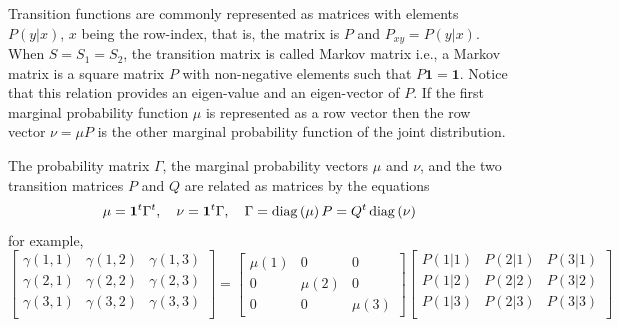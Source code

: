 \documentclass[12pt,a4paper]{amsart}
\newcommand{\one}{\bm 1}
\theoremstyle{plain}%
\theoremstyle{definition}
\theoremstyle{remark}
\begin{document}
Transition functions are commonly represented as matrices with
elements $P(y|x)$, $x$ being the row-index, that is, the matrix is $P$
and $P_{xy} = P(y|x)$. When $S=S_1=S_2$, the transition matrix is
called Markov matrix i.e., a Markov matrix is a square matrix $P$ with
non-negative elements such that $P \one = \one$. Notice that this
relation provides an eigen-value and an eigen-vector of $P$. If the
first marginal probability function $\mu$ is represented as a row
vector then the row vector $\nu = \mu P$ is the other marginal
probability function of the joint distribution.

The probability matrix $\Gamma$, the marginal probability vectors
$\mu$ and $\nu$, and the two transition matrices $P$ and $Q$ are
related as matrices by the equations
\begin{equation*}
  \mu = \one^t \Gamma^t, \quad \nu = \one^t \Gamma, \quad \Gamma = \diagof \mu P = Q^t \diagof \nu 
\end{equation*}
for example,
\begin{equation*}
\begin{bmatrix}
    \gamma(1,1)  & \gamma(1,2) & \gamma(1,3) \\
    \gamma(2,1)  & \gamma(2,2) & \gamma(2,3) \\
    \gamma(3,1)  & \gamma(3,2) & \gamma(3,3) \\
  \end{bmatrix}
  =
  \begin{bmatrix}
 \mu(1) & 0 & 0 \\
  0 & \mu(2) & 0\\
  0 & 0 & \mu(3)     
  \end{bmatrix}
  \begin{bmatrix}
    P(1|1) &   P(2|1) &   P(3|1) \\
    P(1|2) &   P(2|2) &   P(3|2) \\
    P(1|3) &   P(2|3) &   P(3|3) \\
  \end{bmatrix}
\end{equation*}
\end{document}
